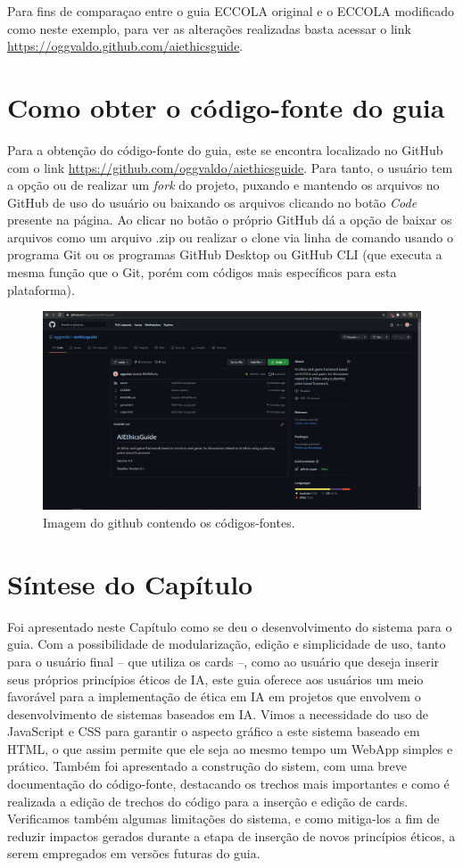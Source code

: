 Para fins de comparaçao entre o guia ECCOLA original e o ECCOLA modificado como neste exemplo, para ver as alterações realizadas basta acessar o link \url{https://oggvaldo.github.com/aiethicsguide}.

\section{Como obter o código-fonte do guia}
Para a obtenção do código-fonte do guia, este se encontra localizado no GitHub com o link \url{https://github.com/oggvaldo/aiethicsguide}. Para tanto, o usuário tem a opção ou de realizar um \textit{fork} do projeto, puxando e mantendo os arquivos no GitHub de uso do usuário ou baixando os arquivos clicando no botão \textit{Code} presente na página. Ao clicar no botão o próprio GitHub dá a opção de baixar os arquivos como um arquivo .zip ou realizar o clone via linha de comando usando o programa Git ou os programas GitHub Desktop ou GitHub CLI (que executa a mesma função que o Git, porém com códigos mais específicos para esta plataforma).

\begin{figure}[h!]
    \centering
    \includegraphics[width=\textwidth]{img/github.png}
    \caption{Imagem do github contendo os códigos-fontes.}
    \label{fig:github}
\end{figure}

\section{Síntese do Capítulo}
Foi apresentado neste Capítulo como se deu o desenvolvimento do sistema para o guia. Com a possibilidade de modularização, edição e simplicidade de uso, tanto para o usuário final -- que utiliza os cards --, como ao usuário que deseja inserir seus próprios princípios éticos de IA, este guia oferece aos usuários um meio favorável para a implementação de ética em IA em projetos que envolvem o desenvolvimento de sistemas baseados em IA. Vimos a necessidade do uso de JavaScript e \acrshort{CSS} para garantir o aspecto gráfico a este sistema baseado em \acrshort{HTML}, o que assim permite que ele seja ao mesmo tempo um WebApp simples e prático. Também foi apresentado a construção do sistem, com uma breve documentação do código-fonte, destacando os trechos mais importantes e como é realizada a edição de trechos do código para a inserção e edição de cards. Verificamos também algumas limitações do sistema, e como mitiga-los a fim de reduzir impactos gerados durante a etapa de inserção de novos princípios éticos, a serem empregados em versões futuras do guia.